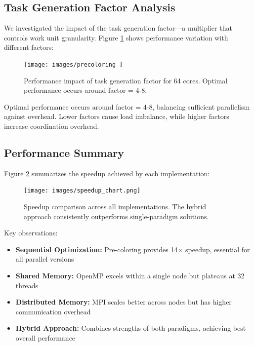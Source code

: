 \subsection{Task Generation Factor Analysis}
We investigated the impact of the task generation factor—a multiplier that controls work unit granularity. Figure \ref{fig:task_factor} shows performance variation with different factors:

\begin{figure}[htbp]
\centering
\texttt{[image: images/precoloring ]}
\caption{Performance impact of task generation factor for 64 cores. Optimal performance occurs around factor = 4-8.}
\label{fig:task_factor}
\end{figure}

Optimal performance occurs around factor = 4-8, balancing sufficient parallelism against overhead. Lower factors cause load imbalance, while higher factors increase coordination overhead.

\subsection{Performance Summary}
Figure \ref{fig:speedup_comparison} summarizes the speedup achieved by each implementation:

\begin{figure}[htbp]
\centering
\texttt{[image: images/speedup\_chart.png]}
\caption{Speedup comparison across all implementations. The hybrid approach consistently outperforms single-paradigm solutions.}
\label{fig:speedup_comparison}
\end{figure}

Key observations:
\begin{itemize}
    \item \textbf{Sequential Optimization:} Pre-coloring provides 14× speedup, essential for all parallel versions
    \item \textbf{Shared Memory:} OpenMP excels within a single node but plateaus at 32 threads
    \item \textbf{Distributed Memory:} MPI scales better across nodes but has higher communication overhead
    \item \textbf{Hybrid Approach:} Combines strengths of both paradigms, achieving best overall performance
\end{itemize}